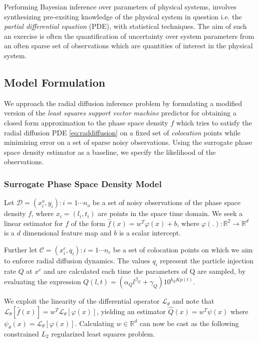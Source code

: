 Performing Bayesian inference over parameters of physical systems,
involves synthesizing pre-exsiting knowledge of the physical system in
question i.e. the \emph{partial differential equation} (PDE), with
statistical techniques. The aim of such an exercise is often the
quantification of uncertainty over system parameters from an often
sparse set of observations which are quantities of interest in the
physical system. 


\subsection{Model Formulation}

We approach the radial diffusion inference problem by formulating a
modified version of the \emph{least squares support vector machine}
predictor for obtaining a closed form approximation to the phase space
density $f$ which tries to satisfy the radial diffusion PDE
\ref{eq:raddiffusion} on a fixed set of \emph{colocation} points while
minimizing error on a set of sparse noisy observations. 
Using the surrogate phase space density estimator as a baseline, we
specify the likelihood of the observations.


\subsubsection*{Surrogate Phase Space Density Model}

Let $\mathcal{D}={(x^{o}_{i}, y_{i}): i = 1 \cdots n_{o}}$ be a set of
noisy observations of the phase space density $f$, where $x_{i} =
(l_{i}, t_{i})$ are points in the space time domain. We seek a linear
estimator for $f$ of the form $\hat{f}(x) = w^{T}\varphi(x) + b$,
where $\varphi(.): \mathbb{R}^{2} \rightarrow \mathbb{R}^{d}$ is a $d$
dimensional feature map and $b$ is a scalar intercept.

Further let $\mathcal{C} ={(x^{c}_{i}, q_{i}): i = 1 \cdots n_{c}}$ be 
a set of colocation points on which we aim to enforce radial diffusion
dynamics. The values $q_{i}$ represent the particle injection rate $Q$ at $x^c$ and 
are calculated each time the parameters of Q are sampled, by evaluating the expression 
$Q(l,t) = (\alpha_{Q}l^{\beta_{Q}} + \gamma_{Q})10^{b_{Q}Kp(t)}$.

We exploit the linearity of the differential operator
$\mathcal{L}_{\theta}$ and note that $\mathcal{L}_{\theta} [\hat{f}(x)]
= w^{T} \mathcal{L}_{\theta}[\varphi(x)]$, yielding an estimator
$\hat{Q}(x) = w^{T}\psi(x)$ where $\psi_{\theta}(x) =
\mathcal{L}_{\theta}[\varphi(x)]$. Calculating $w \in \mathbb{R}^d$
can now be cast as the following constrained $L_2$ regularized 
least squares problem.

